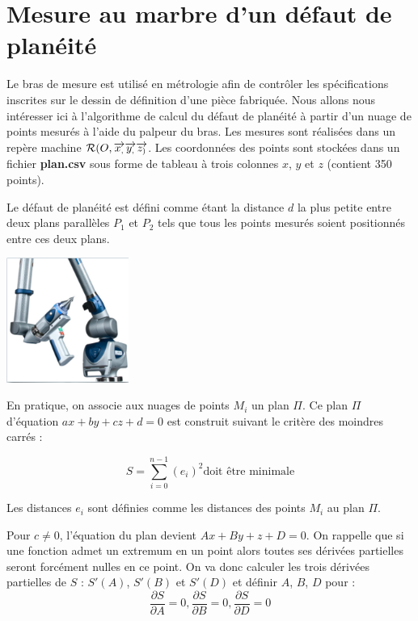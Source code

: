\documentclass[10pt,fleqn]{article} %
\begin{document}
\section{Mesure au marbre d'un défaut de planéité}
\indent
\begin{minipage}[c]{.7\linewidth}
\indent Le bras de mesure est utilisé en métrologie afin de contrôler les spécifications inscrites sur le dessin de définition d'une pièce fabriquée.
Nous allons nous intéresser ici à l'algorithme de calcul du défaut de planéité à partir d'un nuage de points mesurés à l'aide du palpeur du bras. Les mesures sont réalisées dans un repère machine $\mathcal{R}(O,\overrightarrow{x_{,}}\overrightarrow{y_{,}}\overrightarrow{z_{)}}$. Les coordonnées des points sont stockées dans un fichier \textbf{plan.csv} sous forme de tableau à trois colonnes $x$, $y$ et $z$ (contient 350 points).

\vspace{.5cm}

Le défaut de planéité est défini comme étant la distance $d$ la plus petite entre deux plans parallèles $P_1$ et $P_2$ tels que tous les points mesurés soient positionnés entre ces deux plans.
\end{minipage}\hfill
\begin{minipage}[c]{.35\linewidth}
\begin{center}
\includegraphics[width=4cm]{images/bras}
\end{center}
\end{minipage}


En pratique, on associe aux nuages de points $M_i$ un plan $\Pi$. Ce plan $\Pi$ d'équation $ax+by+cz+d=0$ est construit suivant le critère des moindres carrés :

$$S=\sum\limits_{i=0}^{n-1} (e_{i})^{2} \text{doit être minimale}$$



Les distances $e_{i}$ sont définies comme les distances des points $M_i$ au plan $\Pi$.

Pour $c\ne0$, l'équation du plan devient $Ax+By+z+D=0$.
On rappelle que si une fonction admet un extremum en un point alors toutes ses dérivées partielles seront forcément nulles en ce point. On va donc calculer les trois dérivées partielles de $S$ : $S'(A)$, $S'(B)$ et $S'(D)$ et définir $A$, $B$, $D$ pour :
$$
\frac{\partial S}{\partial A}=0, \frac{\partial S}{\partial B}=0, \frac{\partial S}{\partial D}=0
$$
\end{document}
